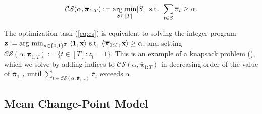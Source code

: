 \begin{align}\label{eq:cs}
    \mathcal{CS}(\alpha, \overline{\boldsymbol{\pi}}_{1:T}) := \underset{S \subseteq[T]}{\text{\normalfont arg min}} |S| \;\text{ s.t. } \sum_{t \in S} \overline{\pi}_t \geq \alpha.
\end{align}
\begin{remark}\label{rmk:knapsack}
    The optimization task (\ref{eq:cs}) is equivalent to solving the integer program $\mathbf{z} := \text{\normalfont arg min}_{\mathbf{x}\in\{0,1\}^T} \; \langle\mathbf{1}, \mathbf{x}\rangle \text{ s.t. } \langle \overline{\boldsymbol{\pi}}_{1:T}, \mathbf{x}\rangle \geq \alpha$, and setting $\mathcal{CS}(\alpha, \overline{\boldsymbol{\pi}}_{1:T}) := \{t \in [T]: z_t = 1\}$. This is an example of a knapsack problem (\citealp{Santini24}), which we solve by adding indices to $\mathcal{CS}(\alpha, \overline{\boldsymbol{\pi}}_{1:T})$ in decreasing order of the value of $\overline{\boldsymbol{\pi}}_{1:T}$ until $\sum_{t \in \mathcal{CS}(\alpha, \overline{\boldsymbol{\pi}}_{1:T})} \overline{\pi}_t$ exceeds $\alpha$. 
\end{remark}
\vspace{-10pt}

\subsection{Mean Change-Point Model}
\label{sec:smcp}

